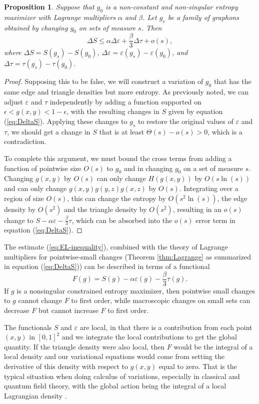 \documentclass[12pt]{amsart}
\newtheorem{proposition}[lemma]{Proposition}
\newcommand\be{\begin{equation}}
\newcommand\ee{\end{equation}}
\newcommand{\tdens}{\tau}
\newcommand{\edens}{\varepsilon}
\begin{document}
{\begin{proposition} \label{prop:EL-inequality} Suppose that $g_0$ is a non-constant and non-singular
entropy maximizer with Lagrange multipliers 
$\alpha$ and $\beta$. Let $g_s$ be a family of graphons obtained by changing $g_0$ on sets of measure 
$s$. Then 
\be \Delta S \le \alpha \Delta \edens + \frac{\beta}{3} \Delta \tdens + o(s), \label{eq:EL-inequality} \ee
where $\Delta S = S(g_s)-S(g_0)$, $\Delta \edens = \edens(g_s)-\edens(g_0)$, and $\Delta \tdens
= \tdens(g_s)-\tdens(g_0)$. 
\end{proposition} 

\begin{proof} Supposing this to be false, we will construct a variation of $g_0$ that has the same edge 
and triangle densities but more entropy. As previously noted, we can adjust $\edens$
and $\tdens$ independently by adding a function supported on $\epsilon < g(x,y) < 1-\epsilon$, with the resulting
changes in $S$ given by equation (\ref{eq:DeltaS}). Applying these changes to $g_s$ to restore the original values
of $\edens$ and $\tdens$, we should get a change in $S$ that is at least $\Theta(s)-o(s)>0$, which is a contradiction. 

To complete this argument, we must bound the cross terms 
from adding a function of pointwise size $O(s)$ to $g_0$ and in changing $g_0$ on a set of measure $s$. 
Changing $g(x,y)$ by $O(s)$ can only change $H(g(x,y))$ by $O(s \ln(s))$ and can only change
$g(x,y)g(y,z)g(x,z)$ by $O(s)$. Integrating over a region of size $O(s)$, this can
change the entropy by $O(s^2 \ln(s))$, the edge density by $O(s^2)$ and the triangle density by $O(s^2)$, 
resulting in an $o(s)$ change to $S - \alpha \edens - \frac{\beta}{3} \tdens$, which can be absorbed into the
$o(s)$ error term in equation (\ref{eq:DeltaS}).
\end{proof}




The estimate (\ref{eq:EL-inequality}), combined with the theory of Lagrange multipliers for pointwise-small changes (Theorem \ref{thm:Lagrange} as summarized in equation (\ref{eq:DeltaS}))
can be described in terms of a functional
\be \label{free energy} F(g) = S(g) - \alpha \edens(g) - \frac{\beta}{3} \tdens(g). \ee 
If $g$ is a nonsingular constrained entropy maximizer, then pointwise small changes to $g$ cannot change $F$
to first order, while
macroscopic changes on small sets can decrease $F$ but cannot increase $F$ to first order. 


The functionals $S$ and $\edens$ are local, in that there is a contribution
from each point $(x,y)$ in $[0,1]^2$ and we integrate the local contributions to
get the global quantity. If the triangle density were also local, 
then $F$ would be the integral of a local
density and our variational equations would come from setting the
derivative of this density with respect to $g(x,y)$ equal to zero. 
That is the typical situation when doing calculus of variations, 
especially in classical and quantum field theory, with 
the global action being the integral of a local Lagrangian density \cite{BS}.

}
\end{document}
